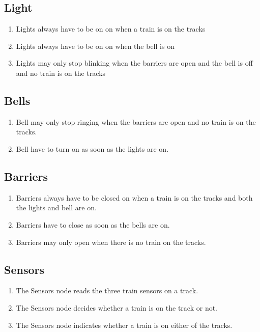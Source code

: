 \documentclass[final]{report}
\begin{document}
\subsection{Light}
	\begin{enumerate}
		\item Lights always have to be on on when a train is on the tracks
		\item Lights always have to be on on when the bell is on
		\item Lights may only stop blinking when the barriers are open and the bell is off and no train is on the tracks
	\end{enumerate}

\subsection{Bells}
	\begin{enumerate}
		\item Bell may only stop ringing when the barriers are open and no train is on the tracks.
		\item Bell have to turn on as soon as the lights are on.
	\end{enumerate}

\subsection{Barriers}
	\begin{enumerate}
		\item Barriers always have to be closed on when a train is on the tracks and both the lights and bell are on.
		\item Barriers have to close as soon as the bells are on.
		\item Barriers may only open when there is no train on the tracks.
	\end{enumerate}

\subsection{Sensors}
	\begin{enumerate}
		\item The Sensors node reads the three train sensors on a track.
		\item The Sensors node decides whether a train is on the track or not.
		\item The Sensors node indicates whether a train is on either of the tracks.
	\end{enumerate}
\end{document}
